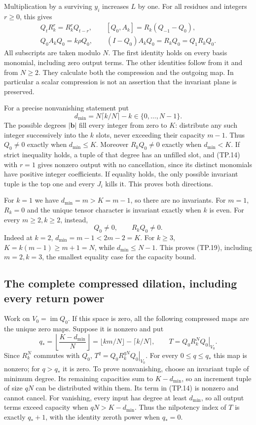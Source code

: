 Multiplication by a surviving \(y_i\) increases \(L\) by one.
For all residues and integers \(r\geq0\), this gives
\[
 \begin{gathered}
 Q_t R_k^r=R_k^r Q_{t-r},\qquad
 [Q_0,A_k]=R_k(Q_{-1}-Q_0),\\
 Q_0A_kQ_0=k\rho Q_0,\qquad
 (I-Q_0)A_kQ_0=R_kQ_0=Q_1R_kQ_0.
 \end{gathered}
 \tag{TP.17}\label{eq:tp-leakage}
\]
All subscripts are taken modulo \(N\). The first identity
holds on every basis monomial, including zero output terms.
The other identities follow from it and from \(N\geq2\).
They calculate both the compression and the outgoing map.
In particular a scalar compression is not an assertion that
the invariant plane is preserved.

For a precise nonvanishing statement put
\[
 d_{\min}=N\lceil k/N\rceil-k\in\{0,\ldots,N-1\}.
 \tag{TP.18}\label{eq:tp-minimum}
\]
The possible degrees \(|\mathbf b|\) fill every integer from
zero to \(K\): distribute any such integer successively into
the \(k\) slots, never exceeding their capacity \(m-1\).
Thus \(Q_0\ne0\) exactly when \(d_{\min}\leq K\).
Moreover \(R_kQ_0\ne0\) exactly when \(d_{\min}<K\).
If strict inequality holds, a tuple of that degree has an
unfilled slot, and (TP.14) with \(r=1\) gives nonzero output
with no cancellation, since its distinct monomials have
positive integer coefficients. If equality holds, the only
possible invariant tuple is the top one and every \(J_i\)
kills it. This proves both directions.

For \(k=1\) we have \(d_{\min}=m>K=m-1\), so there are no
invariants. For \(m=1\), \(R_k=0\) and the unique tensor
character is invariant exactly when \(k\) is even.
For every \(m\geq2,k\geq2\), instead,
\[
 Q_0\ne0,\qquad R_kQ_0\ne0.
 \tag{TP.19}\label{eq:tp-nonzero}
\]
Indeed at \(k=2\), \(d_{\min}=m-1<2m-2=K\).
For \(k\geq3\), \(K=k(m-1)\geq m+1=N\), while
\(d_{\min}\leq N-1\). This proves (TP.19), including
\(m=2,k=3\), the smallest equality case for the capacity bound.

\subsection{The complete compressed dilation, including every return power}

Work on \(V_0=\operatorname{im}Q_0\). If this space is zero,
all the following compressed maps are the unique zero maps.
Suppose it is nonzero and put
\[
 q_* =\left\lfloor\frac{K-d_{\min}}{N}\right\rfloor
       =\lfloor km/N\rfloor-\lceil k/N\rceil,\qquad
 T=\left.Q_0R_k^NQ_0\right|_{V_0}.
 \tag{TP.20}\label{eq:tp-return}
\]
Since \(R_k^N\) commutes with \(Q_0\),
\(T^q=\left.Q_0R_k^{qN}Q_0\right|_{V_0}\).
For every \(0\leq q\leq q_*\) this map is nonzero; for
\(q>q_*\) it is zero. To prove nonvanishing, choose an
invariant tuple of minimum degree. Its remaining capacities
sum to \(K-d_{\min}\), so an increment tuple of size \(qN\)
can be distributed within them. Its term in (TP.14) is
nonzero and cannot cancel. For vanishing, every input has
degree at least \(d_{\min}\), so all output terms exceed
capacity when \(qN>K-d_{\min}\). Thus the nilpotency
index of \(T\) is exactly \(q_*+1\), with the identity
zeroth power when \(q_*=0\).

